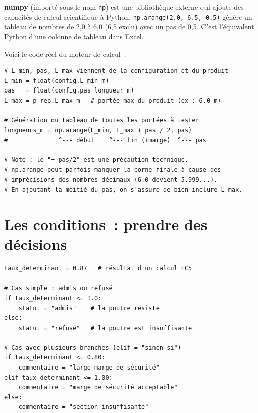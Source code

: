 \documentclass[12pt, a4paper, openany]{book}
\newcommand{\py}[1]{\texttt{#1}}
\newcommand{\fichier}[1]{\texttt{\textit{#1}}}
\begin{document}
\begin{definition}
\textbf{numpy} (import\'e sous le nom \py{np}) est une biblioth\`eque externe
qui ajoute des capacit\'es de calcul scientifique \`a Python.
\py{np.arange(2.0, 6.5, 0.5)} g\'en\`ere un tableau de nombres de 2,0
\`a 6,0 (6,5 exclu) avec un pas de 0,5.
C'est l'\'equivalent Python d'une colonne de tableau dans Excel.
\end{definition}

Voici le code r\'eel du moteur de calcul~:

\begin{lstlisting}[style=python, caption={Extrait de \fichier{moteur.py} --- génération des portées}]
# L_min, pas, L_max viennent de la configuration et du produit
L_min = float(config.L_min_m)
pas   = float(config.pas_longueur_m)
L_max = p_rep.L_max_m   # portée max du produit (ex : 6.0 m)

# Génération du tableau de toutes les portées à tester
longueurs_m = np.arange(L_min, L_max + pas / 2, pas)
#              ^--- début    ^--- fin (+marge)  ^--- pas

# Note : le "+ pas/2" est une précaution technique.
# np.arange peut parfois manquer la borne finale à cause des
# imprécisions des nombres décimaux (6.0 devient 5.999...).
# En ajoutant la moitié du pas, on s'assure de bien inclure L_max.
\end{lstlisting}

\section{Les conditions~: prendre des d\'ecisions}

\begin{lstlisting}[style=python, caption={Conditions \py{if/elif/else} --- statut d'une portée}]
taux_determinant = 0.87   # résultat d'un calcul EC5

# Cas simple : admis ou refusé
if taux_determinant <= 1.0:
    statut = "admis"    # la poutre résiste
else:
    statut = "refusé"   # la poutre est insuffisante

# Cas avec plusieurs branches (elif = "sinon si")
if taux_determinant <= 0.80:
    commentaire = "large marge de sécurité"
elif taux_determinant <= 1.00:
    commentaire = "marge de sécurité acceptable"
else:
    commentaire = "section insuffisante"
\end{lstlisting}
\end{document}
